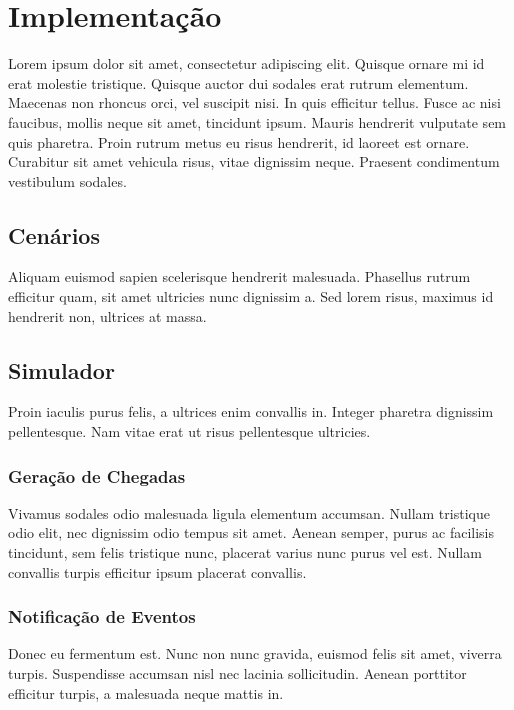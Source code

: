 \chapter{\label{chap:impl}Implementação}

Lorem ipsum dolor sit amet, consectetur adipiscing elit. Quisque ornare mi id
erat molestie tristique. Quisque auctor dui sodales erat rutrum elementum.
Maecenas non rhoncus orci, vel suscipit nisi. In quis efficitur tellus. Fusce ac
nisi faucibus, mollis neque sit amet, tincidunt ipsum. Mauris hendrerit
vulputate sem quis pharetra. Proin rutrum metus eu risus hendrerit, id laoreet
est ornare. Curabitur sit amet vehicula risus, vitae dignissim neque. Praesent
condimentum vestibulum sodales.

\section{Cenários}

Aliquam euismod sapien scelerisque hendrerit malesuada. Phasellus rutrum
efficitur quam, sit amet ultricies nunc dignissim a. Sed lorem risus, maximus id
hendrerit non, ultrices at massa.

\section{Simulador}

Proin iaculis purus felis, a ultrices enim convallis in. Integer pharetra
dignissim pellentesque. Nam vitae erat ut risus pellentesque ultricies.

\subsection{Geração de Chegadas}

Vivamus sodales odio malesuada ligula elementum accumsan. Nullam tristique odio
elit, nec dignissim odio tempus sit amet. Aenean semper, purus ac facilisis
tincidunt, sem felis tristique nunc, placerat varius nunc purus vel est. Nullam
convallis turpis efficitur ipsum placerat convallis.

\subsection{Notificação de Eventos}

Donec eu fermentum est. Nunc non nunc gravida, euismod felis sit amet, viverra
turpis. Suspendisse accumsan nisl nec lacinia sollicitudin. Aenean porttitor
efficitur turpis, a malesuada neque mattis in.

